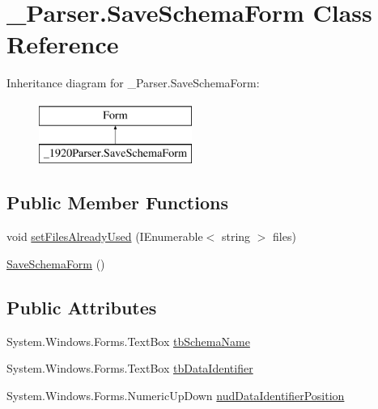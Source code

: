 \hypertarget{class__1920_parser_1_1_save_schema_form}{}\section{\+\_\+Parser.\+Save\+Schema\+Form Class Reference}
\label{class__1920_parser_1_1_save_schema_form}
Inheritance diagram for \+\_\+Parser.\+Save\+Schema\+Form\+:\begin{figure}[H]
\begin{center}
\leavevmode
\includegraphics[height=2.000000cm]{class__1920_parser_1_1_save_schema_form}
\end{center}
\end{figure}
\subsection*{Public Member Functions}
\begin{DoxyCompactItemize}
\item 
void \hyperlink{class__1920_parser_1_1_save_schema_form_a16d5555788d91934ca0e62f9e45fd21d}{set\+Files\+Already\+Used} (I\+Enumerable$<$ string $>$ files)
\item 
\hyperlink{class__1920_parser_1_1_save_schema_form_a75cd87f9ebbc8a116455f8c1394c939d}{Save\+Schema\+Form} ()
\end{DoxyCompactItemize}
\subsection*{Public Attributes}
\begin{DoxyCompactItemize}
\item 
System.\+Windows.\+Forms.\+Text\+Box \hyperlink{class__1920_parser_1_1_save_schema_form_ae4760769155fc202f53ea12b63d14633}{tb\+Schema\+Name}
\item 
System.\+Windows.\+Forms.\+Text\+Box \hyperlink{class__1920_parser_1_1_save_schema_form_a6b4727fdf859c257a72b637ffae15bdc}{tb\+Data\+Identifier}
\item 
System.\+Windows.\+Forms.\+Numeric\+Up\+Down \hyperlink{class__1920_parser_1_1_save_schema_form_afb1dbb18d04daa7d93d504ebf2b28dae}{nud\+Data\+Identifier\+Position}
\end{DoxyCompactItemize}
